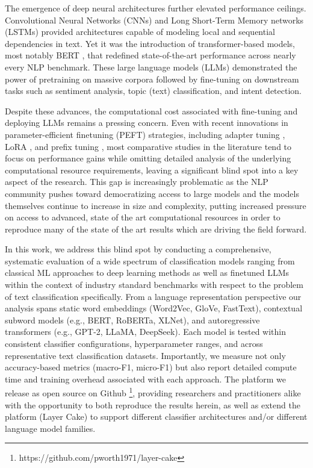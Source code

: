 \documentclass[final]{clv2025}
\begin{document}
The emergence of deep neural architectures further elevated performance ceilings. Convolutional Neural Networks (CNNs) \cite{yoon2014convolutional} and Long Short-Term Memory networks (LSTMs) \cite{hochreiterlong} provided architectures capable of modeling local and sequential dependencies in text. Yet it was the introduction of transformer-based models, most notably BERT \cite{devlin-etal-2019-bert}, that redefined state-of-the-art performance across nearly every NLP benchmark. These large language models (LLMs) demonstrated the power of pretraining on massive corpora followed by fine-tuning on downstream tasks such as sentiment analysis, topic (text) classification, and intent detection.

Despite these advances, the computational cost associated with fine-tuning and deploying LLMs remains a pressing concern. Even with recent innovations in parameter-efficient finetuning (PEFT) strategies, including adapter tuning \cite{pmlr-v97-houlsby19a}, LoRA \cite{hu2021loralowrankadaptationlarge}, and prefix tuning \cite{li2021prefixtuningoptimizingcontinuousprompts}, most comparative studies in the literature tend to focus on performance gains while omitting detailed analysis of the underlying computational resource requirements, leaving a significant blind spot into a key aspect of the research. This gap is increasingly problematic as the NLP community pushes toward democratizing access to large models and the models themselves continue to increase in size and complexity, putting increased pressure on access to advanced, state of the art computational resources in order to reproduce many of the state of the art results which are driving the field forward.

In this work, we address this blind spot by conducting a comprehensive, systematic evaluation of a wide spectrum of classification models ranging from classical ML approaches to deep learning methods as well as finetuned LLMs within the context of industry standard benchmarks with respect to the problem of text classification specifically. From a language representation perspective our analysis spans static word embeddings (Word2Vec, GloVe, FastText), contextual subword models (e.g., BERT, RoBERTa, XLNet), and autoregressive transformers (e.g., GPT-2, LLaMA, DeepSeek). Each model is tested within consistent classifier configurations, hyperparameter ranges, and across representative text classification datasets. Importantly, we measure not only accuracy-based metrics (macro-F1, micro-F1) but also report detailed compute time and training overhead associated with each approach. The platform we release as open source on Github \footnote{  https://github.com/pworth1971/layer-cake}, providing researchers and practitioners alike with the opportunity to both reproduce the results herein, as well as extend the platform (Layer Cake) to support different classifier architectures and/or different language model families.
\end{document}
